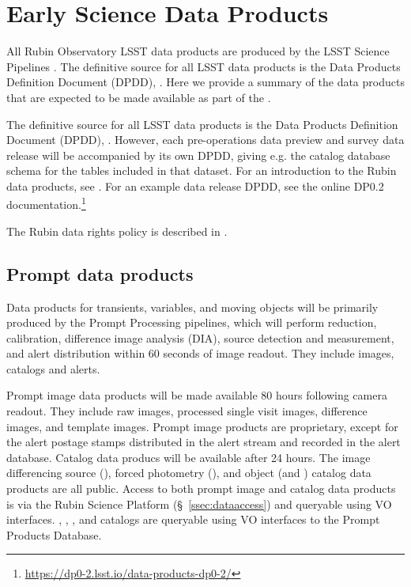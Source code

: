 \section{Early Science Data Products}
\label{sec:data}

All Rubin Observatory LSST data products are produced by the LSST Science Pipelines \cite{2019ASPC..523..521B,2018PASJ...70S...5B}. 
The definitive source for all LSST data products is the Data Products Definition Document (DPDD), \citep{LSE-163}.  
Here we provide a summary of the data products that are expected to be made available as part of the \esp.


The definitive source for all LSST data products is the Data Products Definition Document (DPDD), \citep{LSE-163}.
However, each pre-operations data preview and survey data release will be accompanied by its own DPDD, giving e.g. the catalog database schema for the tables included in that dataset.
For an introduction to the Rubin data products, see \citet{RubinDataProductsAbridged}.
For an example data release DPDD, see the online DP0.2 documentation.\footnote{\url{https://dp0-2.lsst.io/data-products-dp0-2/}}

The Rubin data rights policy is described in  \cite{RDO-013}.

\subsection{Prompt data products}

Data products for transients, variables, and moving objects will be primarily produced by the Prompt Processing pipelines, which will perform reduction, calibration, difference image analysis (DIA), source detection and measurement, and alert distribution within 60 seconds of image readout. 
They include images, catalogs and alerts. 

Prompt image data products will be made available 80 hours following camera readout. 
They include raw images, processed single visit images, difference images, and template images. 
Prompt image products are proprietary, except for the alert postage stamps distributed in the alert stream and recorded in the alert database.
Catalog data producs will be available after 24 hours. 
The image differencing source (\DIASource), forced photometry (\DIAForcedSource), and object (\DIAObject and \SSObject)
catalog data products are all public. 
Access to both prompt image and catalog data products is via the Rubin Science Platform (\S~\ref{ssec:dataaccess}) and queryable using VO interfaces. 
\DIASource, \DIAForcedSource, \DIAObject, and \SSObject catalogs are queryable using VO interfaces to the Prompt Products Database.


